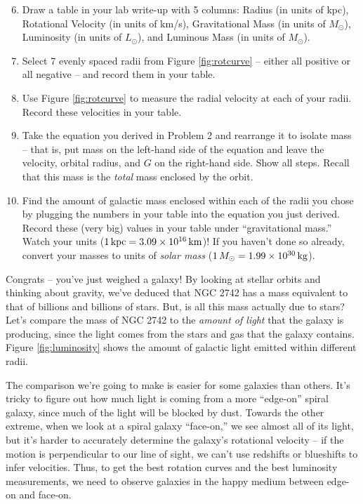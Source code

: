 \documentclass[11pt]{article}%
\begin{document}
\begin{enumerate}
\setcounter{enumi}{5}

\item Draw a table in your lab write-up with 5 columns: Radius (in units of kpc), Rotational Velocity (in units of km/s), Gravitational Mass (in units of $M_{\odot}$), Luminosity (in units of $L_{\odot}$), and Luminous Mass (in units of $M_{\odot}$).

\item Select 7 evenly spaced radii from Figure \ref{fig:rotcurve} -- either all positive or all negative -- and record them in your table.

\item Use Figure \ref{fig:rotcurve} to measure the radial velocity at each of your radii. Record these velocities in your table.

\item Take the equation you derived in Problem 2 and rearrange it to isolate mass -- that is, put mass on the left-hand side of the equation and leave the velocity, orbital radius, and $G$ on the right-hand side. Show all steps. Recall that this mass is the \emph{total} mass enclosed by the orbit.

\item Find the amount of galactic mass enclosed within each of the radii you chose by plugging the numbers in your table into the equation you just derived. Record these (very big) values in your table under ``gravitational mass.'' Watch your units ($1 \, {\rm kpc} = 3.09 \times 10^{16} \, {\rm km}$)!  If you haven't done so already, convert your masses to units of \emph{solar mass} ($1 \, M_\odot = 1.99 \times 10^{30} \, {\rm kg}$).
\end{enumerate}

\noindent
Congrats -- you've just weighed a galaxy! By looking at stellar orbits and thinking about gravity, we've deduced that NGC 2742 has a mass equivalent to that of billions and billions of stars. But, is all this mass actually due to stars? Let's compare the mass of NGC 2742 to the \emph{amount of light} that the galaxy is producing, since the light comes from the stars and gas that the galaxy contains.  Figure \ref{fig:luminosity} shows the amount of galactic light emitted within different radii. 

\medskip \noindent
The comparison we're going to make is easier for some galaxies than others. It's tricky to figure out how much light is coming from a more ``edge-on'' spiral galaxy, since much of the light will be blocked by dust. Towards the other extreme, when we look at a spiral galaxy ``face-on,'' we see almost all of its light, but it's harder to accurately determine the galaxy's rotational velocity -- if the motion is perpendicular to our line of sight, we can't use redshifts or blueshifts to infer velocities. Thus, to get the best rotation curves and the best luminosity measurements, we need to observe galaxies in the happy medium between edge-on and face-on.
\end{document}

